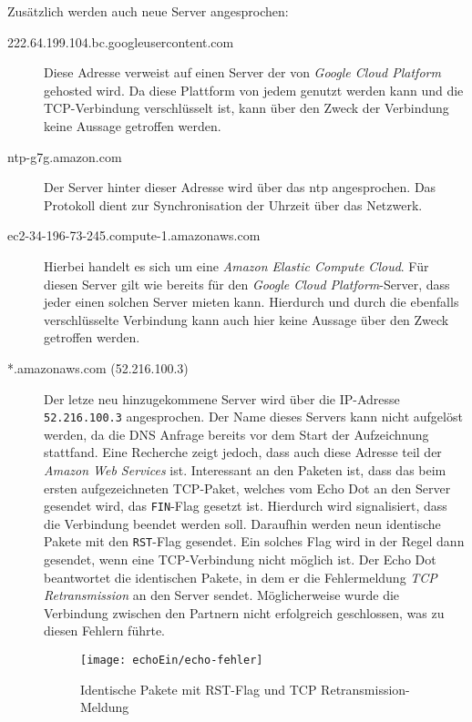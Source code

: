 Zusätzlich werden auch neue Server angesprochen:
\begin{description}
    \item[222.64.199.104.bc.googleusercontent.com]
        Diese Adresse verweist auf einen Server der von \textit{Google Cloud Platform} gehosted wird.
        Da diese Plattform von jedem genutzt werden kann und die TCP-Verbindung verschlüsselt ist,
        kann über den Zweck der Verbindung keine Aussage getroffen werden.
    \item[ntp-g7g.amazon.com]
        Der Server hinter dieser Adresse wird über das \ac{ntp} angesprochen.
        Das Protokoll dient zur Synchronisation der Uhrzeit über das Netzwerk.
    \item[ec2-34-196-73-245.compute-1.amazonaws.com]
        Hierbei handelt es sich um eine \textit{Amazon Elastic Compute Cloud}\cite{WasistAm39:online}.
        Für diesen Server gilt wie bereits für den \textit{Google Cloud Platform}-Server,
        dass jeder einen solchen Server mieten kann.
        Hierdurch und durch die ebenfalls verschlüsselte Verbindung kann auch hier keine Aussage über den Zweck getroffen werden.
    \item[*.amazonaws.com (52.216.100.3)]
        Der letze neu hinzugekommene Server wird über die IP-Adresse \texttt{52.216.100.3} angesprochen.
        Der Name dieses Servers kann nicht aufgelöst werden, da die DNS Anfrage bereits vor dem Start der Aufzeichnung stattfand.
        Eine Recherche zeigt jedoch, dass auch diese Adresse teil der \textit{Amazon Web Services} ist.
        Interessant an den Paketen ist,
        dass das beim ersten aufgezeichneten TCP-Paket,
        welches vom Echo Dot an den Server gesendet wird,
        das \texttt{FIN}-Flag gesetzt ist.
        Hierdurch wird signalisiert, dass die Verbindung beendet werden soll.
        Daraufhin werden neun identische Pakete mit den \texttt{RST}-Flag gesendet.
        Ein solches Flag wird in der Regel dann gesendet, wenn eine TCP-Verbindung nicht möglich ist.
        Der Echo Dot beantwortet die identischen Pakete, in dem er die Fehlermeldung \textit{TCP Retransmission} an den Server sendet.
        Möglicherweise wurde die Verbindung zwischen den Partnern nicht erfolgreich geschlossen, was zu diesen Fehlern führte.
        \begin{figure}[h!]
            \centering
            \texttt{[image: echoEin/echo-fehler]}
            \caption{Identische Pakete mit RST-Flag und TCP Retransmission-Meldung}\label{fig:echo-fehler}
        \end{figure}
\end{description}

